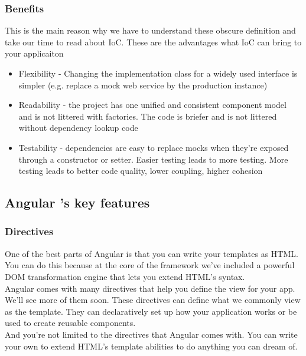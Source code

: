 \documentclass[14pt,a4paper]{extreport}
\begin{document}
			\subsubsection{Benefits}
		This is the main reason why we have to understand these obscure definition and take our time to read about IoC. These are the advantages what IoC can bring to your applicaiton
			\begin{itemize}
			\item Flexibility - Changing the implementation class for a widely used interface is simpler (e.g. replace a mock web service by the production instance)
			\item Readability - the project has one unified and consistent component model and is not littered with factories. The code is briefer and is not littered without dependency lookup code 
			\item Testability - dependencies are easy to replace mocks when they're exposed through a constructor or setter. Easier testing leads to more testing. More testing leads to better code quality, lower coupling, higher cohesion
			\end{itemize}
	
		\subsection{Angular 's key features}
			\subsubsection{Directives}
				One of the best parts of Angular is that you can write your templates as HTML. You can
do this because at the core of the framework we’ve included a powerful DOM transformation engine that lets you extend HTML’s syntax.
\\
Angular comes with many directives that help you define the view for your app. We’ll see more of them soon. These directives can define what we commonly view as the template. They can declaratively set up how your application works or be used to create reusable components.
\\

And you’re not limited to the directives that Angular comes with. You can write your
own to extend HTML’s template abilities to do anything you can dream of.	
\\
\end{document}
